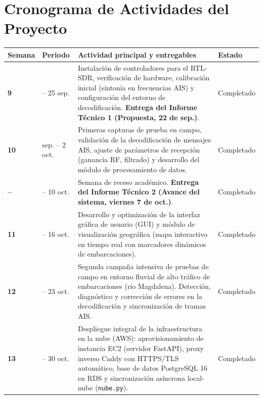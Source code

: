\documentclass[11pt,a4paper]{article}
\begin{document}
\section*{Cronograma de Actividades del Proyecto}

\begin{table}[htbp]
\centering
\small
\renewcommand{\arraystretch}{1.3}
\begin{tabularx}{\textwidth}{>{\centering\arraybackslash}p{1.3cm} >{\centering\arraybackslash}p{2.6cm} >{\raggedright\arraybackslash}X >{\centering\arraybackslash}p{2.2cm}}
\toprule
\textbf{Semana} & \textbf{Periodo} & \textbf{Actividad principal y entregables} & \textbf{Estado} \\
\midrule
\textbf{9}  & 21 -- 25 sep. & Instalación de controladores para el RTL-SDR, verificación de hardware, calibración inicial (sintonía en frecuencias AIS) y configuración del entorno de decodificación. \textbf{Entrega del Informe Técnico 1 (Propuesta, 22 de sep.)}. & Completado \\
\addlinespace[3pt]
\textbf{10} & 28 sep. -- 2 oct. & Primeras capturas de prueba en campo, validación de la decodificación de mensajes AIS, ajuste de parámetros de recepción (ganancia RF, filtrado) y desarrollo del módulo de procesamiento de datos. & Completado \\
\addlinespace[3pt]
\textbf{--} & 6 -- 10 oct. & Semana de receso académico. \textbf{Entrega del Informe Técnico 2 (Avance del sistema, viernes 7 de oct.)}. & Completado \\
\addlinespace[3pt]
\textbf{11} & 12 -- 16 oct. & Desarrollo y optimización de la interfaz gráfica de usuario (GUI) y módulo de visualización geográfica (mapa interactivo en tiempo real con marcadores dinámicos de embarcaciones). & Completado \\
\addlinespace[3pt]
\textbf{12} & 19 -- 23 oct. & Segunda campaña intensiva de pruebas de campo en entorno fluvial de alto tráfico de embarcaciones (río Magdalena). Detección, diagnóstico y corrección de errores en la decodificación y sincronización de tramas AIS. & Completado \\
\addlinespace[3pt]
\textbf{13} & 26 -- 30 oct. & Despliegue integral de la infraestructura en la nube (AWS): aprovisionamiento de instancia EC2 (servidor FastAPI), proxy inverso Caddy con HTTPS/TLS automático, base de datos PostgreSQL 16 en RDS y sincronización asíncrona local-nube (\texttt{nube.py}). & Completado \\

\end{tabularx}
\end{table}
\end{document}
